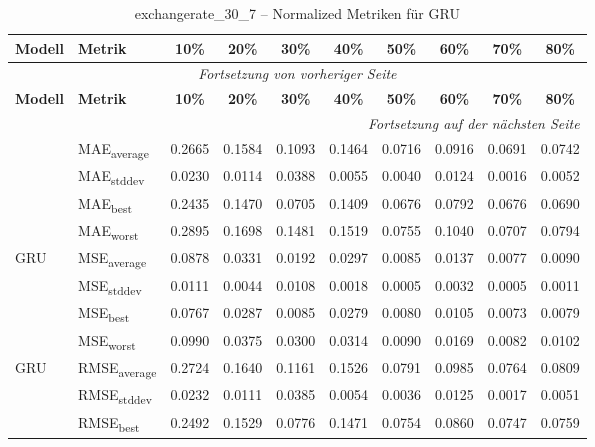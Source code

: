 {\small
\begin{longtable}{l l c c c c c c c c}
    \toprule
    \textbf{Modell} & \textbf{Metrik} & \textbf{10\%} & \textbf{20\%} & \textbf{30\%} & \textbf{40\%} & \textbf{50\%} & \textbf{60\%} & \textbf{70\%} & \textbf{80\%} \\
    \midrule
    \endfirsthead
    \multicolumn{10}{c}{\textit{Fortsetzung von vorheriger Seite}} \\
    \toprule
    \textbf{Modell} & \textbf{Metrik} & \textbf{10\%} & \textbf{20\%} & \textbf{30\%} & \textbf{40\%} & \textbf{50\%} & \textbf{60\%} & \textbf{70\%} & \textbf{80\%} \\
    \midrule
    \endhead
    \midrule
    \multicolumn{10}{r}{\textit{Fortsetzung auf der nächsten Seite}} \\
    \midrule
    \endfoot
    \bottomrule
    \caption{exchangerate_30_7 -- Normalized Metriken für GRU}
    \label{tab:exchangerate_30_7_normalized_gru}
    \endlastfoot
\multirow{4}{*}{GRU} & MAE\textsubscript{average} & 0.2665 & 0.1584 & 0.1093 & 0.1464 & 0.0716 & 0.0916 & 0.0691 & 0.0742 \\
 & MAE\textsubscript{stddev} & 0.0230 & 0.0114 & 0.0388 & 0.0055 & 0.0040 & 0.0124 & 0.0016 & 0.0052 \\
 & MAE\textsubscript{best} & 0.2435 & 0.1470 & 0.0705 & 0.1409 & 0.0676 & 0.0792 & 0.0676 & 0.0690 \\
 & MAE\textsubscript{worst} & 0.2895 & 0.1698 & 0.1481 & 0.1519 & 0.0755 & 0.1040 & 0.0707 & 0.0794 \\
\cmidrule(lr){2-10}
\multirow{4}{*}{GRU} & MSE\textsubscript{average} & 0.0878 & 0.0331 & 0.0192 & 0.0297 & 0.0085 & 0.0137 & 0.0077 & 0.0090 \\
 & MSE\textsubscript{stddev} & 0.0111 & 0.0044 & 0.0108 & 0.0018 & 0.0005 & 0.0032 & 0.0005 & 0.0011 \\
 & MSE\textsubscript{best} & 0.0767 & 0.0287 & 0.0085 & 0.0279 & 0.0080 & 0.0105 & 0.0073 & 0.0079 \\
 & MSE\textsubscript{worst} & 0.0990 & 0.0375 & 0.0300 & 0.0314 & 0.0090 & 0.0169 & 0.0082 & 0.0102 \\
\cmidrule(lr){2-10}
\multirow{4}{*}{GRU} & RMSE\textsubscript{average} & 0.2724 & 0.1640 & 0.1161 & 0.1526 & 0.0791 & 0.0985 & 0.0764 & 0.0809 \\
 & RMSE\textsubscript{stddev} & 0.0232 & 0.0111 & 0.0385 & 0.0054 & 0.0036 & 0.0125 & 0.0017 & 0.0051 \\
 & RMSE\textsubscript{best} & 0.2492 & 0.1529 & 0.0776 & 0.1471 & 0.0754 & 0.0860 & 0.0747 & 0.0759 \\

\end{longtable}}
